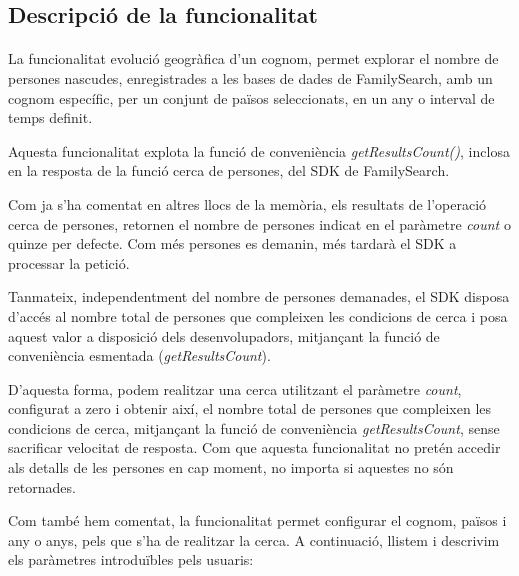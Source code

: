 \subsection{Descripció de la funcionalitat}

    \paragraph{}
    La funcionalitat evolució geogràfica d'un cognom, permet explorar el nombre de persones nascudes, enregistrades a les bases de dades de FamilySearch, amb un cognom específic, per un conjunt de països seleccionats, en un any o interval de temps definit.

    Aquesta funcionalitat explota la funció de conveniència \emph{getResultsCount()}, inclosa en la resposta de la funció cerca de persones, del SDK de FamilySearch.

    Com ja s'ha comentat en altres llocs de la memòria, els resultats de l'operació cerca de persones, retornen el nombre de persones indicat en el paràmetre \emph{count} o quinze per defecte. Com més persones es demanin, més tardarà el SDK a processar la petició.

    Tanmateix, independentment del nombre de persones demanades, el SDK disposa d’accés al nombre total de persones que compleixen les condicions de cerca i posa aquest valor a disposició dels desenvolupadors, mitjançant la funció de conveniència esmentada (\emph{getResultsCount}).

    D'aquesta forma, podem realitzar una cerca utilitzant el paràmetre \emph{count}, con\-fi\-gu\-rat a zero i obtenir així, el nombre total de persones que compleixen les condicions de cerca, mitjançant la funció de conveniència \emph{getResultsCount}, sense sacrificar velocitat de resposta. Com que aquesta funcionalitat no pretén accedir als detalls de les persones en cap moment, no importa si aquestes no són retornades.

    Com també hem comentat, la funcionalitat permet configurar el cognom, països i any o anys, pels que s'ha de realitzar la cerca. A continuació, llistem i descrivim els paràmetres introduïbles pels usuaris:

